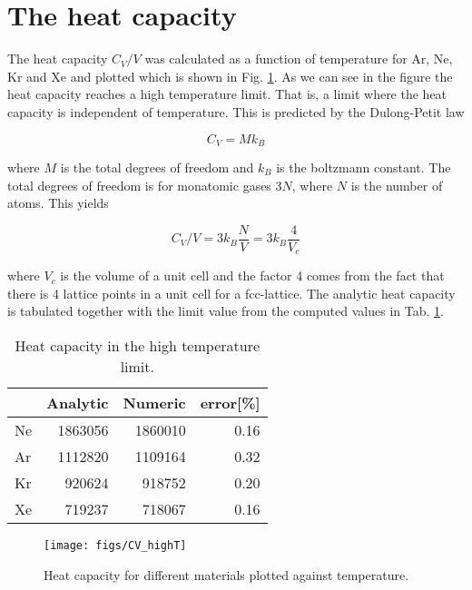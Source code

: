 \section{The heat capacity}

The heat capacity $C_V/V$ was calculated as a function of temperature for Ar, Ne, Kr and Xe and plotted which is shown in Fig. \ref{fig:heat}. As we can see in the figure the heat capacity reaches a high temperature limit. That is, a limit where the heat capacity is independent of temperature. This is predicted by the Dulong-Petit law

\begin{equation*}
  C_V = M k_B
\end{equation*}

where $M$ is the total degrees of freedom and $k_B$ is the boltzmann constant. The total degrees of freedom is for monatomic gases $3N$, where $N$ is the number of atoms. This yields

\begin{equation*}
  C_V / V = 3k_B \frac{N}{V} = 3k_B \frac{4}{V_c}
\end{equation*}

where $V_c$ is the volume of a unit cell and the factor 4 comes from the fact that there is 4 lattice points in a unit cell for a fcc-lattice. The analytic heat capacity is tabulated together with the limit value from the computed values in Tab. \ref{tab:heat}.

\begin{table}[h]
\centering
  \caption{Heat capacity in the high temperature limit.}
  \label{tab:heat}
  \begin{tabular}{l|rrr}
    & Analytic & Numeric & error[\%] \\ \hline
    Ne & 1863056 & 1860010 & 0.16\\
    Ar &  1112820 &  1109164 & 0.32\\
    Kr & 920624 &  918752 & 0.20\\
    Xe &  719237 & 718067 & 0.16
  \end{tabular}
\end{table}

\begin{figure}[H]
  \centering
  \texttt{[image: figs/CV\_highT]}
  \caption{Heat capacity for different materials plotted against temperature.}
  \label{fig:heat}
\end{figure}
